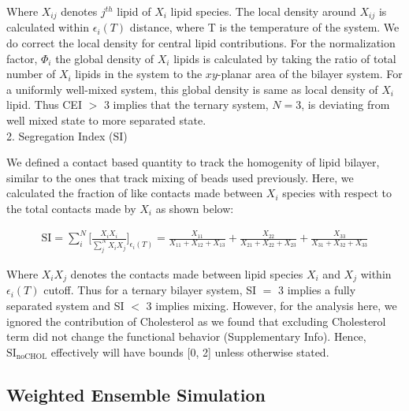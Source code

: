 \documentclass{biophys-new}
\begin{document}
Where $X_{ij}$ denotes $j^{th}$ lipid of $X_i$ lipid species.
The local density around $X_{ij}$ is calculated within $\epsilon_i(T)$ distance, where T is the temperature of the system.
We do correct the local density for central lipid contributions.
For the normalization factor, $\Phi_i$ the global density of $X_i$ lipids is calculated by taking the ratio of total number of $X_i$ lipids in the system to the $xy$-planar area of the bilayer system.
For a uniformly well-mixed system, this global density is same as local density of $X_{i}$ lipid.
Thus CEI $>$ 3 implies that the ternary system, $N=3$, is deviating from well mixed state to more separated state. 
\\

2. Segregation Index (SI)

We defined a contact based quantity to track the homogenity of lipid bilayer, similar to the ones that track mixing of beads used previously\cite{Marigo2012,Kumar2020}.
Here, we calculated the fraction of like contacts made between $X_i$ species with respect to the total contacts made by $X_i$ as shown below:

\begin{equation}
    \begin{aligned}
    \label{eq:CLT}
    \text{SI} = \sum_{i}^{N}\Bigg[\frac{X_iX_i}{\sum_{j}^{N}X_iX_j}\Bigg]_{\text{$\epsilon_i(T)$}} = \frac{X_{11}}{X_{11} + X_{12} + X_{13}} + \frac{X_{22}}{X_{21} + X_{22} + X_{23}} + \frac{X_{33}}{X_{31} + X_{32} + X_{33}}
    \end{aligned}
\end{equation}

Where $X_iX_j$ denotes the contacts made between lipid species $X_i$ and $X_j$ within $\epsilon_i(T)$ cutoff.
Thus for a ternary bilayer system, SI $=$ 3 implies a fully separated system and SI $<$ 3 implies mixing.
However, for the analysis here, we ignored the contribution of Cholesterol as we found that excluding Cholesterol term did not change the functional behavior (Supplementary Info).
Hence, $\text{SI}_{\text{noCHOL}}$ effectively will have bounds [0, 2] unless otherwise stated.    

\subsection*{Weighted Ensemble Simulation}
\end{document}
